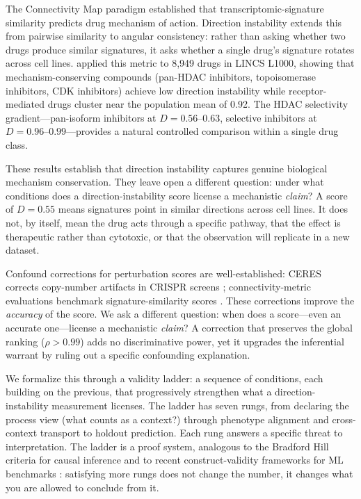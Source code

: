 \documentclass{article}
\begin{document}
The Connectivity Map paradigm \citep{lamb2006connectivity,subramanian2017next}
established that transcriptomic-signature similarity predicts drug mechanism
of action. Direction instability extends this from pairwise similarity to
angular consistency: rather than asking whether two drugs produce similar
signatures, it asks whether a single drug's signature rotates across cell
lines. \citet{tower2026bracket} applied this metric to 8{,}949 drugs in
LINCS L1000, showing that mechanism-conserving compounds (pan-HDAC
inhibitors, topoisomerase inhibitors, CDK inhibitors) achieve low direction
instability while receptor-mediated drugs cluster near the population mean
of 0.92. The HDAC selectivity gradient---pan-isoform
inhibitors at $D = 0.56$--$0.63$, selective inhibitors at $D = 0.96$--$0.99$---provides
a natural controlled comparison within a single drug class.

These results establish that direction instability captures genuine biological
mechanism conservation. They leave open a different question: under what
conditions does a direction-instability score license a mechanistic \emph{claim}?
A score of $D = 0.55$ means signatures point in similar directions across cell
lines. It does not, by itself, mean the drug acts through a specific pathway,
that the effect is therapeutic rather than cytotoxic, or that the observation
will replicate in a new dataset.

Confound corrections for perturbation scores are well-established:
CERES corrects copy-number artifacts in CRISPR screens
\citep{meyers2017ceres}; connectivity-metric evaluations benchmark
signature-similarity scores \citep{li2020comprehensive}. These
corrections improve the \emph{accuracy} of the score. We ask a different
question: when does a score---even an accurate one---license a mechanistic
\emph{claim}? A correction that preserves the global ranking ($\rho > 0.99$)
adds no discriminative power, yet it upgrades the inferential warrant by
ruling out a specific confounding explanation.

We formalize this through a validity ladder: a sequence of conditions, each
building on the previous, that progressively strengthen what a
direction-instability measurement licenses. The ladder has seven rungs, from
declaring the process view (what counts as a context?) through phenotype
alignment and cross-context transport to holdout prediction. Each rung
answers a specific threat to interpretation. The ladder is a proof system,
analogous to the Bradford Hill criteria for causal inference and to recent
construct-validity frameworks for ML benchmarks
\citep{freiesleben2025benchmarking}: satisfying more rungs does not change
the number, it changes what you are allowed to conclude from it.
\end{document}
